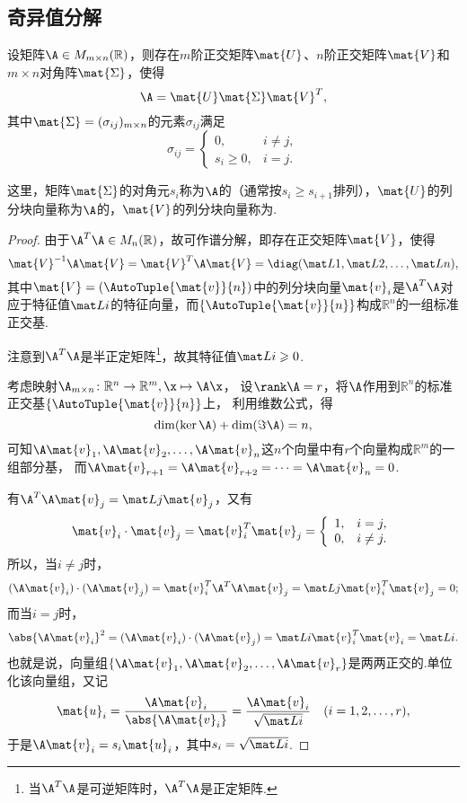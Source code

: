 \subsection{奇异值分解}
\begin{theorem}
\def\U{\mat{U}}
\def\S{\mat{\Sigma}}
\def\V{\mat{V}}
\let\Q\V
\let\P\U
\def\p{\mat{u}}
\def\q{\mat{v}}
设矩阵\(\A \in M_{m \times n}(\mathbb{R})\)，则存在\(m\)阶正交矩阵\(\U\)、\(n\)阶正交矩阵\(\V\)和\(m \times n\)对角阵\(\S\)，使得\[
\A = \U \S \V^T,
\]其中\(\S = (\sigma_{ij})_{m \times n}\)的元素\(\sigma_{ij}\)满足\[
\sigma_{ij} = \left\{ \begin{array}{cc}
0, & i \neq j, \\
s_i \geqslant 0, & i = j.
\end{array} \right.
\]

这里，矩阵\(\S\)的对角元\(s_i\)称为\(\A\)的（通常按\(s_i \geqslant s_{i+1}\)排列），\(\U\)的列分块向量称为\(\A\)的，\(\V\)的列分块向量称为.
\begin{proof}
由于\(\A^T \A \in M_n(\mathbb{R})\)，故可作谱分解，即存在正交矩阵\(\Q\)，使得\[
\Q^{-1}\A\Q = \Q^T\A\Q = \diag(\L{1},\L{2},\dotsc,\L{n}),
\]其中\(\Q=(\AutoTuple{\q}{n})\)中的列分块向量\(\q_i\)是\(\A^T \A\)对应于特征值\(\L{i}\)的特征向量，而\(\{\AutoTuple{\q}{n}\}\)构成\(\mathbb{R}^n\)的一组标准正交基.

注意到\(\A^T \A\)是半正定矩阵\footnote{当\(\A^T \A\)是可逆矩阵时，\(\A^T \A\)是正定矩阵.}，故其特征值\(\L{i}\geqslant0\).

考虑映射\(\A_{m \times n}\colon \mathbb{R}^n \to \mathbb{R}^m, \x \mapsto \A\x\)，%
设\(\rank\A = r\)，将\(\A\)作用到\(\mathbb{R}^n\)的标准正交基\(\{\AutoTuple{\q}{n}\}\)上，%
利用维数公式，得\[
\dim(\ker \A) + \dim(\Im \A) = n,
\]
可知\(\A\q_1,\A\q_2,\dotsc,\A\q_n\)这\(n\)个向量中有\(r\)个向量构成\(\mathbb{R}^m\)的一组部分基，%
而\(\A\q_{r+1} = \A\q_{r+2} = \dotsb = \A\q_n = 0\).

有\(\A^T \A \q_j = \L{j} \q_j\)，又有\[
\q_i \cdot \q_j = \q_i^T \q_j
= \left\{ \begin{array}{lc}
1, & i=j, \\
0, & i \neq j.
\end{array} \right.
\]所以，当\(i \neq j\)时，\[
(\A\q_i)\cdot(\A\q_j) = \q_i^T \A^T \A \q_j = \L{j} \q_i^T \q_j = 0;
\]而当\(i = j\)时，\[
\abs{\A\q_i}^2 = (\A\q_i)\cdot(\A\q_j) = \L{i} \q_i^T \q_i = \L{i}.
\]也就是说，向量组\(\{\A\q_1,\A\q_2,\dotsc,\A\q_r\}\)是两两正交的.单位化该向量组，又记\[
\p_i = \frac{\A\q_i}{\abs{\A\q_i}}
= \frac{\A\q_i}{\sqrt{\L{i}}}
\quad(i=1,2,\dotsc,r),
\]于是\(\A\q_i = s_i \p_i\)，其中\(s_i = \sqrt{\L{i}}\).


\end{proof}
\end{theorem}
